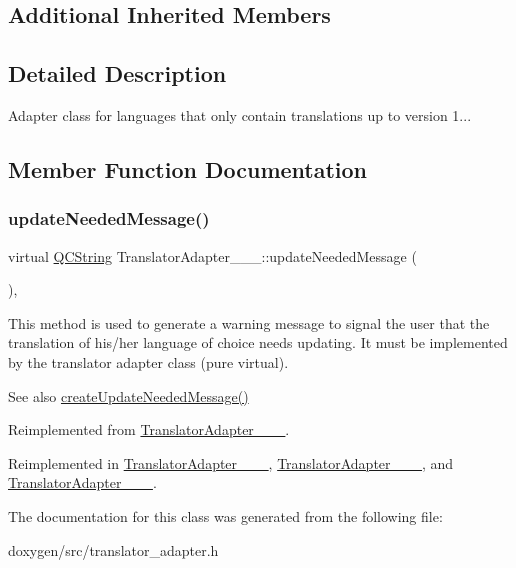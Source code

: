 \subsection*{Additional Inherited Members}


\subsection{Detailed Description}
Adapter class for languages that only contain translations up to version 1... 

\subsection{Member Function Documentation}
\mbox{\label{class_translator_adapter__1__6__3_ab3d79abfb926c41bd7609eeb706654fe}} 
\subsubsection{\texorpdfstring{updateNeededMessage()}{updateNeededMessage()}}
{\footnotesize\ttfamily virtual \mbox{\hyperlink{class_q_c_string}{Q\+C\+String}} Translator\+Adapter\+\_\+\_\+\_\+::update\+Needed\+Message (\begin{DoxyParamCaption}{ }\end{DoxyParamCaption})\hspace{0.3cm}{\ttfamily [inline]}, {\ttfamily [virtual]}}

This method is used to generate a warning message to signal the user that the translation of his/her language of choice needs updating. It must be implemented by the translator adapter class (pure virtual).

\begin{DoxySeeAlso}{See also}
\mbox{\hyperlink{class_translator_adapter_base_a71493b87a34d6e4c232e540734aba698}{create\+Update\+Needed\+Message()}} 
\end{DoxySeeAlso}


Reimplemented from \mbox{\hyperlink{class_translator_adapter__1__7__5_a6e69d48e79a13c9d934f9af1a8befd8a}{Translator\+Adapter\+\_\+\_\+\_}}.



Reimplemented in \mbox{\hyperlink{class_translator_adapter__1__4__6_ab19b01d4e00c95ef1e6eb631fbe6ada4}{Translator\+Adapter\+\_\+\_\+\_}}, \mbox{\hyperlink{class_translator_adapter__1__5__4_a587a31dad925e47f206b6a0cda9eedd0}{Translator\+Adapter\+\_\+\_\+\_}}, and \mbox{\hyperlink{class_translator_adapter__1__6__0_abc231eb2c1864ca9f878e7e5deb94f54}{Translator\+Adapter\+\_\+\_\+\_}}.



The documentation for this class was generated from the following file\+:\begin{DoxyCompactItemize}
\item 
doxygen/src/translator\+\_\+adapter.\+h\end{DoxyCompactItemize}
